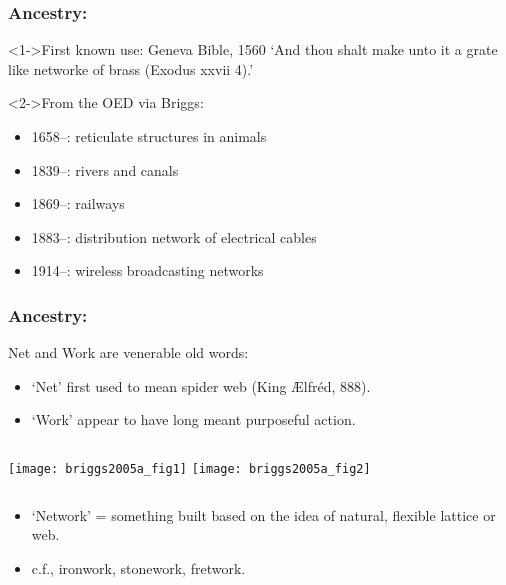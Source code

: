 \begin{frame}
  \frametitle{Ancestry:}

  \begin{block}<1->{First known use: Geneva Bible, 1560}
    `And thou shalt make unto it a grate like networke of brass (Exodus xxvii 4).'
  \end{block}

  \begin{block}<2->{From the OED via Briggs:}
    \begin{itemize}
    \item<2-> 
      1658--: reticulate structures in animals
    \item<3-> 
      1839--: rivers and canals
    \item<4-> 
      1869--: railways
    \item<5-> 
      1883--: distribution network of electrical cables
    \item<6-> 
      1914--: wireless broadcasting networks
    \end{itemize}
  \end{block}

\end{frame}


\begin{frame}
  \frametitle{Ancestry:}

  \begin{block}{Net and Work are venerable old words:}
    \begin{itemize}
    \item
      \alert{`Net'} first used to mean spider web 
      {\small (King {\AE}lfr\'{e}d, 888)}.
    \item
      \alert{`Work'} appear to have long meant purposeful action.
    \end{itemize}
  \end{block}

  \begin{columns}
    \texttt{[image: briggs2005a\_fig1]}
    \texttt{[image: briggs2005a\_fig2]}
  \end{columns}

  \begin{itemize}
  \item<2->
    `Network' = something built
    based on the idea of natural, flexible lattice or web.
  \item<3-> 
    c.f., ironwork, stonework, fretwork.
  \end{itemize}

\end{frame}

